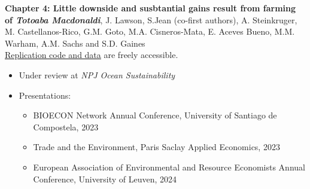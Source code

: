 %
\textbf{Chapter 4: Little downside and susbtantial gains result from farming of \textit{Totoaba Macdonaldi}}, J. Lawson, S.Jean (co-first authors), A. Steinkruger, M. Castellanos-Rico, G.M. Goto, M.A. Cisneros-Mata, E. Aceves Bueno, M.M. Warham, A.M. Sachs and S.D. Gaines\\
\href{https://github.com/julawson/conservation_farming_totoaba}{Replication code and data} are freely accessible.
%
\begin{itemize}
\item Under review at \textit{NPJ Ocean Sustainability}
\item Presentations:
\begin{itemize}
\item BIOECON Network Annual Conference, University of Santiago de Compostela, 2023
\item Trade and the Environment, Paris Saclay Applied Economics, 2023
\item European Association of Environmental and Resource Economists Annual Conference, University of Leuven, 2024
\end{itemize}
\end{itemize}
%

